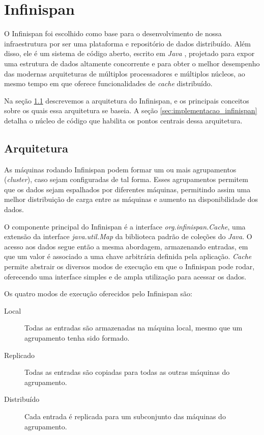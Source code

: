 \documentclass[11pt,twoside,a4paper]{book}
\begin{document}
\section{Infinispan}
\label{sec:infinispan}
O Infinispan foi escolhido como base para o desenvolvimento de nossa infraestrutura por ser uma plataforma e repositório de dados distribuído. Além disso, ele é um sistema de código aberto, escrito em \emph{Java} \cite{java}, projetado para expor uma estrutura de dados altamente concorrente e para obter o melhor desempenho das modernas arquiteturas de múltiplos processadores e múltiplos núcleos, ao mesmo tempo em que oferece funcionalidades de \emph{cache} distribuído.

Na seção \ref{sec:arquitetura_infinispan} descrevemos a arquitetura do Infinispan, e os principais conceitos sobre os quais essa arquitetura se baseia. A seção \ref{sec:implementacao_infinispan} detalha o núcleo de código que habilita os pontos centrais dessa arquitetura.

\subsection{Arquitetura}
\label{sec:arquitetura_infinispan}
As máquinas rodando Infinispan podem formar um ou mais agrupamentos (\emph{cluster}), caso sejam configuradas de tal forma. Esses agrupamentos permitem que os dados sejam espalhados por diferentes máquinas, permitindo assim uma melhor distribuição de carga entre as máquinas e aumento na disponibilidade dos dados.

O componente principal do Infinispan é a interface \emph{org.infinispan.Cache}, uma extensão da interface \emph{java.util.Map} da biblioteca padrão de coleções do \emph{Java}. O acesso aos dados segue então a mesma abordagem, armazenando entradas, em que um valor é associado a uma chave arbitrária definida pela aplicação. \emph{Cache} permite abstrair os diversos modos de execução em que o Infinispan pode rodar, oferecendo uma interface simples e de ampla utilização para acessar os dados.

Os quatro modos de execução oferecidos pelo Infinispan são:

\begin{description}
	\item[Local] Todas as entradas são armazenadas na máquina local, mesmo que um agrupamento tenha sido formado.
	\item[Replicado] Todas as entradas são copiadas para todas as outras máquinas do agrupamento.
	\item[Distribuído] Cada entrada é replicada para um subconjunto das máquinas do agrupamento.
\end{description}
\end{document}
